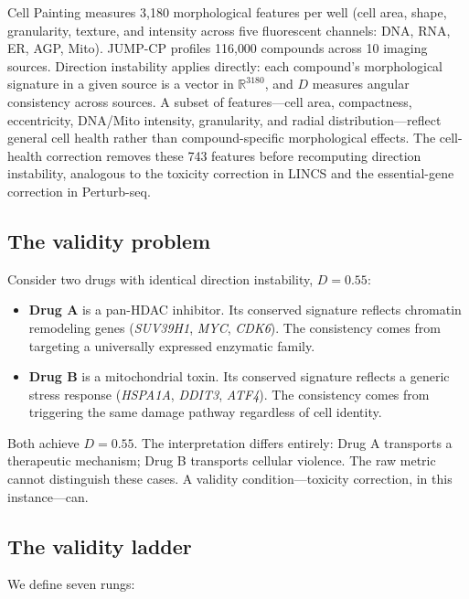 \documentclass{article}
\begin{document}
Cell Painting \citep{chandrasekaran2023jump} measures 3{,}180 morphological
features per well (cell area, shape, granularity, texture, and intensity
across five fluorescent channels: DNA, RNA, ER, AGP, Mito). JUMP-CP
profiles 116{,}000 compounds across 10 imaging sources. Direction
instability applies directly: each compound's morphological signature in a
given source is a vector in $\mathbb{R}^{3180}$, and $D$ measures angular
consistency across sources. A subset of features---cell area, compactness,
eccentricity, DNA/Mito intensity, granularity, and radial
distribution---reflect general cell health rather than compound-specific
morphological effects. The cell-health correction removes these 743 features
before recomputing direction instability, analogous to the toxicity
correction in LINCS and the essential-gene correction in Perturb-seq.

\subsection{The validity problem}

Consider two drugs with identical direction instability, $D = 0.55$:

\begin{itemize}
  \item \textbf{Drug A} is a pan-HDAC inhibitor. Its conserved signature
    reflects chromatin remodeling genes (\emph{SUV39H1}, \emph{MYC},
    \emph{CDK6}). The consistency comes from targeting a universally
    expressed enzymatic family.
  \item \textbf{Drug B} is a mitochondrial toxin. Its conserved signature
    reflects a generic stress response (\emph{HSPA1A}, \emph{DDIT3},
    \emph{ATF4}). The consistency comes from triggering the same damage
    pathway regardless of cell identity.
\end{itemize}

Both achieve $D = 0.55$. The interpretation differs entirely: Drug A
transports a therapeutic mechanism; Drug B transports cellular violence. The
raw metric cannot distinguish these cases. A validity condition---toxicity
correction, in this instance---can.

\subsection{The validity ladder}

We define seven rungs:
\end{document}
